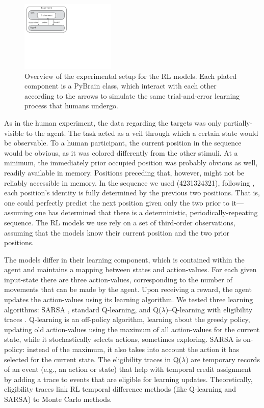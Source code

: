 \documentclass[man,floatsintext]{apa6}
\begin{document}
\begin{figure}[ht]
  \centering
  \includegraphics[width=0.4\textwidth]{figures/RL_model}
  \caption{Overview of the experimental setup for the RL models. Each plated component is a PyBrain class, which interact with each other according to the arrows to simulate the same trial-and-error learning process that humans undergo.}
  \label{fig:rl-model}
\end{figure} 

As in the human experiment, the data regarding the targets was only partially-visible to the agent. The task acted as a veil through which a certain state would be observable. To a human participant, the current position in the sequence would be obvious, as it was colored differently from the other stimuli. At a minimum, the immediately prior occupied position was probably obvious as well, readily available in memory. Positions preceding that, however, might not be reliably accessible in memory. In the sequence we used (4231324321), following , each position's identity is fully determined by the previous two positions. That is, one could perfectly predict the next position given only the two prior to it---assuming one has determined that there is a deterministic, periodically-repeating sequence. The RL models we use rely on a set of third-order observations, assuming that the models know their current position and the two prior positions.

The models differ in their learning component, which is contained within the agent and maintains a mapping between states and action-values. For each given input-state there are three action-values, corresponding to the number of movements that can be made by the agent. Upon receiving a reward, the agent updates the action-values using its learning algorithm. We tested three learning algorithms: SARSA \cite{Rummery94on-lineq-learning}, standard Q-learning, and Q($\lambda$)--Q-learning with eligibility traces \cite{Watkins:1989}. Q-learning is an off-policy algorithm, learning about the greedy policy, updating old action-values using the maximum of all action-values for the current state, while it stochastically selects actions, sometimes exploring. SARSA is on-policy: instead of the maximum, it also takes into account the action it has selected for the current state. The eligibility traces in Q($\lambda$) are temporary records of an event (e.g., an action or state) that help with temporal credit assignment by adding a trace to events that are eligible for learning updates. Theoretically, eligibility traces link RL temporal difference methods (like Q-learning and SARSA) to Monte Carlo methods.
\end{document}
